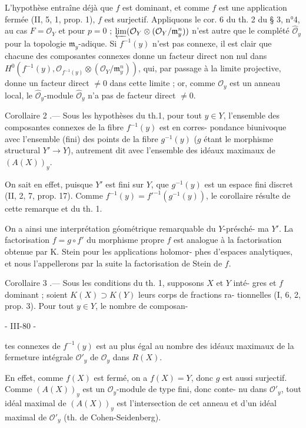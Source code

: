 L'hypothèse entraîne déjà que $f$ est dominant, et comme $f$ est une
application fermée (II, 5, 1, prop. 1), $f$ est surjectif. Appliquons le cor. 6 du th. 2 du § 3, n°4, au cas $F = \mathcal{O}_Y$ et pour $p=0$ ;
$\varprojlim ( \mathcal{O}_Y \otimes ( \mathcal{O}_Y / \mathfrak{m}_y^n ) )$ n'est autre que le complété $\hat{\mathcal{O}}_y$ pour la topologie
$\mathfrak{m}_y$-adique. Si $f^{-1}(y)$ n'est pas connexe, il est clair que chacune
des composantes connexes donne un facteur direct non nul dans
$H^0(f^{-1}(y), \mathcal{O}_{f^{-1}(y)} \otimes (\mathcal{O}_Y / \mathfrak{m}_y^n))$, qui, par passage à la limite projective,
donne un facteur direct $\neq 0$ dans cette limite ; or, comme $\mathcal{O}_y$ est un
anneau local, le $\hat{\mathcal{O}}_y$-module $\hat{\mathcal{O}}_y$ n'a pas de facteur direct $\neq 0$.

Corollaire 2 .— Sous les hypothèses du th.1, pour tout $y \in Y$,
l'ensemble des composantes connexes de la fibre $f^{-1}(y)$ est en corres-
pondance biunivoque avec l'ensemble (fini) des points de la fibre
$g^{-1}(y)$ ($g$ étant le morphisme structural $Y' \to Y$), autrement dit avec
l'ensemble des idéaux maximaux de $(A(X))_y$.

On sait en effet, puisque $Y'$ est fini sur $Y$, que $g^{-1}(y)$ est un
espace fini discret (II, 2, 7, prop. 17). Comme $f^{-1}(y) = f'^{-1}(g^{-1}(y))$,
le corollaire résulte de cette remarque et du th. 1.

On a ainsi une interprétation géométrique remarquable du $Y$-présché-
ma $Y'$. La factorisation $f = g \circ f'$ du morphisme propre $f$ est analogue
à la factorisation obtenue par K. Stein pour les applications holomor-
phes d'espaces analytiques, et nous l'appellerons par la suite la
factorisation de Stein de $f$.

Corollaire 3 .— Sous les conditions du th. 1, supposons $X$ et $Y$ inté-
gres et $f$ dominant ; soient $K(X) \supset K(Y)$ leurs corps de fractions ra-
tionnelles (I, 6, 2, prop. 3). Pour tout $y \in Y$, le nombre de composan-

\newpage


- III-80 -

tes connexes de $f^{-1}(y)$ est au plus égal au nombre des idéaux maximaux
de la fermeture intégrale $\mathcal{O}'_y$ de $\mathcal{O}_y$ dans $R(X)$.

En effet, comme $f(X)$ est fermé, on a $f(X)=Y$, donc $g$ est aussi
surjectif. Comme $(A(X))_y$ est un $\mathcal{O}_y$-module de type fini, donc conte-
nu dans $\mathcal{O}'_y$, tout idéal maximal de $(A(X))_y$ est l'intersection de cet
anneau et d'un idéal maximal de $\mathcal{O}'_y$ (th. de Cohen-Seidenberg).

